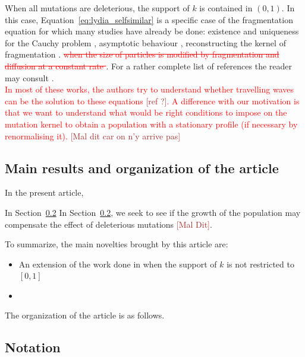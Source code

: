 \documentclass[11pt]{amsart}
\newcommand{\ndr}[1]{\textcolor{brown}{[#1]}}
\newcommand{\guim}[1]{\textcolor{red}{#1}}
\newcommand{\guimrem}[1]{\textcolor{red}{\sout{#1}}}
\begin{document}
When all mutations are deleterious, the support of $k$ is contained in $(0,1)$. In this case, Equation~\eqref{eq:lydia_selfsimilar} is a specific case of the fragmentation equation for which many studies have already be done: existence and uniqueness for the Cauchy problem \cite{melzak1957scalar}, asymptotic behaviour \cite{doumic2016time}, reconstructing the kernel of fragmentation \cite{hoang2017estimating,hoang2017nonparametric, doumic2018estimating,doumic2021inverse}. \guimrem{when the size of particles is modified by fragmentation and diffusion at a constant rate \cite{laurenccot2022fragmentation}}. 
For a rather complete list of references the reader may consult \cite{banasiak2019analytic}.\\

\guim{
In most of these works, the authors try to understand whether travelling waves can be the solution to these equations \ndr{ref ?}. A difference with our motivation is that we want to understand what would be right conditions to impose on the mutation kernel to obtain a population with a stationary profile (if necessary by renormalising it).} \ndr{Mal dit car on n'y arrive pas}\\
    

\subsection{Main results and organization of the article} \mbox{}

In the present article, 

In Section~\ref{}
In Section~\ref{}, we seek to see if the growth of the population may compensate the effect of deleterious mutations \ndr{Mal Dit}. 

To summarize, the main novelties brought by this article are: 
\begin{itemize}
    \item An extension of the work done in \cite{doumic2016time} when the support of $k$ is not restricted to $[0,1]$
    \item 
\end{itemize}

The organization of the article is as follows.

\subsection{Notation} \mbox{}
\end{document}
